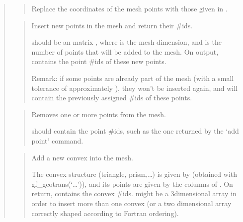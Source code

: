 \documentclass[a4paper,11pt,english]{sphinxmanual}
\begin{document}
\sphinxAtStartPar
{}
\begin{quote}

\sphinxAtStartPar
{}
\begin{quote}

\sphinxAtStartPar
Replace the coordinates of the mesh points with those given in .
\end{quote}

\sphinxAtStartPar
{}
\begin{quote}

\sphinxAtStartPar
Insert new points in the mesh and return their \#ids.

\sphinxAtStartPar
{} should be an  matrix , where  is the mesh
dimension, and  is the number of points that will be
added to the mesh. On output,  contains the point \#ids
of these new points.

\sphinxAtStartPar
Remark: if some points are already part of the mesh (with a small
tolerance of approximately ), they won’t be inserted again,
and  will contain the previously assigned \#ids of these
points.
\end{quote}

\sphinxAtStartPar
{}
\begin{quote}

\sphinxAtStartPar
Removes one or more points from the mesh.

\sphinxAtStartPar
{} should contain the point \#ids, such as the one returned by
the ‘add point’ command.
\end{quote}

\sphinxAtStartPar
{}
\begin{quote}

\sphinxAtStartPar
Add a new convex into the mesh.

\sphinxAtStartPar
The convex structure (triangle, prism,…) is given by 
(obtained with gf\_geotrans(‘…’)), and its points are given by
the columns of . On return,  contains the convex \#ids.
 might be a 3\sphinxhyphen{}dimensional array in order to insert more than
one convex (or a two dimensional array correctly shaped according
to Fortran ordering).
\end{quote}


\end{quote}
\end{document}

